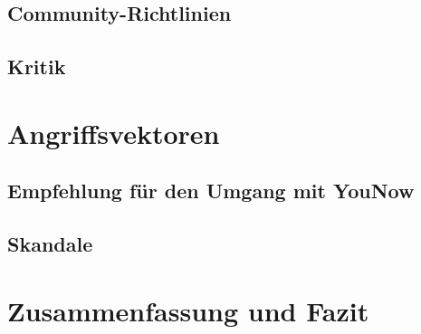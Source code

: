 \documentclass[bibliography=totoc,a4paper,12pt]{scrartcl}
\begin{document}
\subsection{Community-Richtlinien}

\subsection{Kritik}


\section{Angriffsvektoren}


\subsection{Empfehlung für den Umgang mit YouNow}

\subsection{Skandale}


\section{Zusammenfassung und Fazit}

\pagebreak



\end{document}
